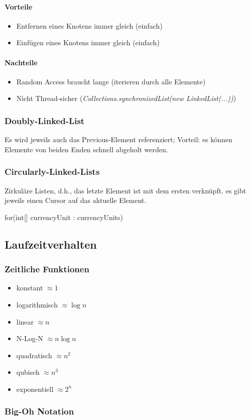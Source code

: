 \paragraph{Vorteile}
\begin{itemize}
	\item Entfernen eines Knotens immer gleich (einfach)
	\item Einfügen eines Knotens immer gleich (einfach)
\end{itemize}

\paragraph{Nachteile}
\begin{itemize}
	\item Random Access braucht lange (iterieren durch alle Elemente)
	\item Nicht Thread-sicher (\emph{Collections.synchronizedList(new LinkedList(...))})
\end{itemize}

\subsubsection{Doubly-Linked-List}

Es wird jeweils auch das Previous-Element referenziert; Vorteil: es können Elemente von beiden Enden schnell abgeholt werden.

\subsubsection{Circularly-Linked-Lists}

Zirkuläre Listen, d.h., das letzte Element ist mit dem ersten verknüpft. es gibt jeweils einen Cursor auf das aktuelle Element.

for(int[] currencyUnit : currencyUnits)   
\subsection{Laufzeitverhalten}

\subsubsection{Zeitliche Funktionen}
\begin{itemize}
	\item konstant $\approx 1$
	\item logarithmisch $\approx \log n$
	\item linear $\approx  n$
	\item N-Log-N $\approx n \log n$
	\item quadratisch $\approx n^2$
	\item qubisch $\approx n^3$
	\item exponentiell $\approx 2^n$
\end{itemize}

\subsubsection{Big-Oh Notation}
 
	 

\pagebreak
\tableofcontents

